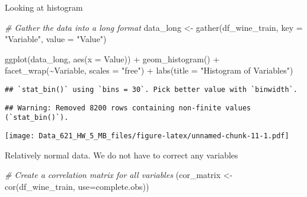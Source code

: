 \documentclass[
]{article}
\newenvironment{Shaded}{\begin{snugshade}}{\end{snugshade}}
\newcommand{\AttributeTok}[1]{\textcolor[rgb]{0.77,0.63,0.00}{#1}}
\newcommand{\CommentTok}[1]{\textcolor[rgb]{0.56,0.35,0.01}{\textit{#1}}}
\newcommand{\FunctionTok}[1]{\textcolor[rgb]{0.00,0.00,0.00}{#1}}
\newcommand{\NormalTok}[1]{#1}
\newcommand{\OtherTok}[1]{\textcolor[rgb]{0.56,0.35,0.01}{#1}}
\newcommand{\SpecialCharTok}[1]{\textcolor[rgb]{0.00,0.00,0.00}{#1}}
\newcommand{\StringTok}[1]{\textcolor[rgb]{0.31,0.60,0.02}{#1}}
\begin{document}
Looking at histogram

\begin{Shaded}
\begin{Highlighting}[]
\CommentTok{\# Gather the data into a long format}
\NormalTok{data\_long }\OtherTok{\textless{}{-}} \FunctionTok{gather}\NormalTok{(df\_wine\_train, }\AttributeTok{key =} \StringTok{"Variable"}\NormalTok{, }\AttributeTok{value =} \StringTok{"Value"}\NormalTok{)}

\FunctionTok{ggplot}\NormalTok{(data\_long, }\FunctionTok{aes}\NormalTok{(}\AttributeTok{x =}\NormalTok{ Value)) }\SpecialCharTok{+}
  \FunctionTok{geom\_histogram}\NormalTok{() }\SpecialCharTok{+}
  \FunctionTok{facet\_wrap}\NormalTok{(}\SpecialCharTok{\textasciitilde{}}\NormalTok{Variable, }\AttributeTok{scales =} \StringTok{"free"}\NormalTok{) }\SpecialCharTok{+}
  \FunctionTok{labs}\NormalTok{(}\AttributeTok{title =} \StringTok{"Histogram of Variables"}\NormalTok{)}
\end{Highlighting}
\end{Shaded}

\begin{verbatim}
## `stat_bin()` using `bins = 30`. Pick better value with `binwidth`.
\end{verbatim}

\begin{verbatim}
## Warning: Removed 8200 rows containing non-finite values (`stat_bin()`).
\end{verbatim}

\texttt{[image: Data\_621\_HW\_5\_MB\_files/figure-latex/unnamed-chunk-11-1.pdf]}

Relatively normal data. We do not have to correct any variables

\begin{Shaded}
\begin{Highlighting}[]
\CommentTok{\# Create a correlation matrix for all variables}
\NormalTok{(cor\_matrix }\OtherTok{\textless{}{-}} \FunctionTok{cor}\NormalTok{(df\_wine\_train, }\AttributeTok{use=}\StringTok{\textquotesingle{}complete.obs\textquotesingle{}}\NormalTok{))}
\end{Highlighting}
\end{Shaded}
\end{document}
